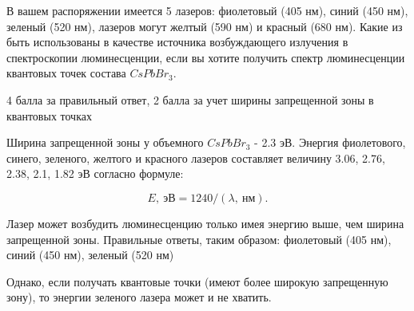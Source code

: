 
В вашем распоряжении имеется 5 лазеров: фиолетовый (405 нм), синий (450 нм), зеленый (520 нм), лазеров могут желтый (590 нм) и красный (680 нм). Какие из быть использованы в качестве источника возбуждающего излучения в спектроскопии люминесценции, если вы хотите получить спектр люминесценции квантовых точек состава $CsPbBr_3$.

4 балла за правильный ответ, 2 балла за учет ширины запрещенной зоны в квантовых точках

\explanationSection

Ширина запрещенной зоны у объемного $CsPbBr_3$ - 2.3 эВ. Энергия фиолетового, синего, зеленого, желтого и красного лазеров составляет величину 3.06, 2.76, 2.38, 2.1, 1.82 эВ согласно формуле:

$$E, \: \text{эВ}=  1240/(\lambda, \: \text{нм}).$$ 

Лазер может возбудить люминесценцию  только имея энергию выше, чем ширина запрещенной зоны. Правильные ответы, таким образом: фиолетовый (405 нм), синий (450 нм), зеленый (520 нм)

Однако, если получать квантовые точки (имеют более широкую запрещенную зону), то энергии зеленого лазера может и не хватить.